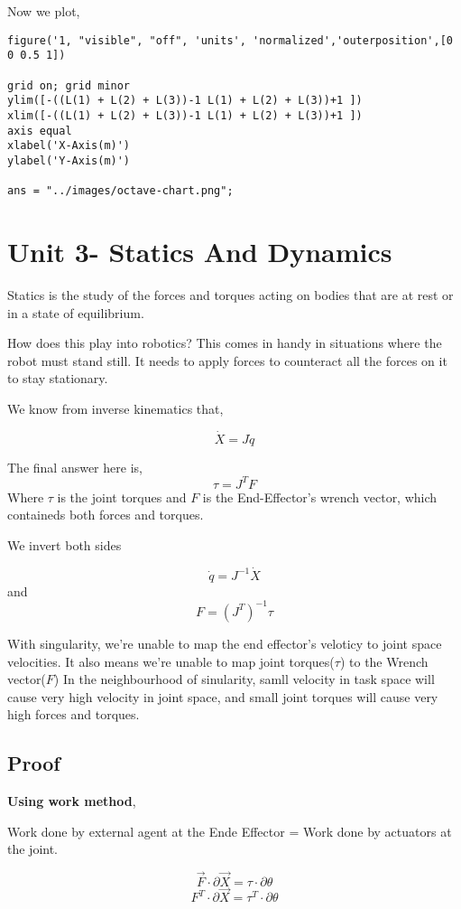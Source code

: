\documentclass[11pt]{report}
\begin{document}
\begin{enumerate}
\begin{enumerate}
\begin{enumerate}
Now we plot,
\begin{verbatim}
figure('1, "visible", "off", 'units', 'normalized','outerposition',[0 0 0.5 1])

grid on; grid minor
ylim([-((L(1) + L(2) + L(3))-1 L(1) + L(2) + L(3))+1 ])
xlim([-((L(1) + L(2) + L(3))-1 L(1) + L(2) + L(3))+1 ])
axis equal
xlabel('X-Axis(m)')
ylabel('Y-Axis(m)')

ans = "../images/octave-chart.png";
\end{verbatim}
\end{enumerate}
\end{enumerate}
\end{enumerate}
\chapter{Unit 3- Statics And Dynamics}
\label{sec:org331f141}
Statics is the study of the forces and torques acting on bodies that are at rest or in a state of equilibrium.

How does this play into robotics? This comes in handy in situations where the robot must stand still. It needs to apply forces to counteract all the forces on it to stay stationary.

We know from inverse kinematics that,

$$\dot{X} = J \dot{q}$$

The final answer here is,
$$\tau = J^TF$$
Where \(\tau\) is the joint torques and \(F\) is the End-Effector's wrench vector, which containeds both forces and torques.

We invert both sides

$$\dot{q} = J^{-1}\dot{X}$$ and $$F = (J^T)^{-1}\tau$$

With singularity, we're unable to map the end effector's veloticy to joint space velocities. It also means we're unable to map joint torques(\(\tau\)) to the Wrench vector(\(F\)) In the neighbourhood of  sinularity, samll velocity in task space will cause very high velocity in joint space, and small joint torques will cause very high forces and torques.
\section{Proof}
\label{sec:orgfe790b7}
\textbf{Using work method},

Work done by external agent at the Ende Effector = Work done by actuators at the joint.

$$\vec{F} \cdot \partial {\vec{X}} = \tau \cdot \partial \theta $$
$${F}^{T} \cdot \partial {\vec{X}} = \tau^{T} \cdot \partial \theta $$
\end{document}
